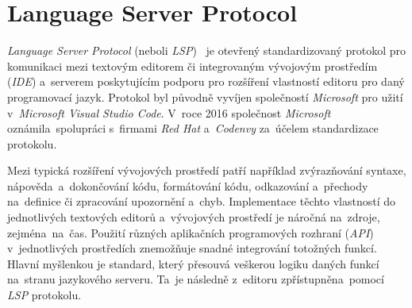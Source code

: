 \section{Language Server Protocol}
\label{lsp} 
\emph{Language Server Protocol} (neboli \emph{LSP})~\cite{lspgithub} je otevřený standardizovaný protokol pro komunikaci mezi textovým editorem či integrovaným vývojovým prostředím (\emph{IDE}) a~serverem poskytujícím podporu pro rozšíření vlastností editoru pro daný programovací jazyk. Protokol byl původně vyvíjen společností \emph{Microsoft} pro užití v~\emph{Microsoft Visual Studio Code}. V~roce 2016 společnost \emph{Microsoft} oznámila~spolupráci s~firmami \emph{Red Hat} a~\emph{Codenvy} za~účelem standardizace protokolu. 

Mezi typická rozšíření vývojových prostředí patří například zvýrazňování syntaxe, nápověda~a~dokončování kódu, formátování kódu, odkazování a~přechody na~definice či zpracování upozornění a~chyb.
Implementace těchto vlastností do jednotlivých textových editorů a~vývojových prostředí je náročná na~zdroje, zejména~na~čas. Použití různých aplikačních programových rozhraní (\emph{API}) v~jednotlivých prostředích znemožňuje snadné integrování totožných funkcí. Hlavní myšlenkou je standard, který přesouvá veškerou logiku daných funkcí na~stranu jazykového serveru. Ta~je následně z~editoru zpřístupněna~pomocí \emph{LSP} protokolu. 


